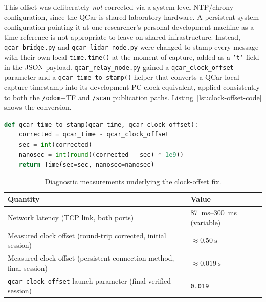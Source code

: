 This offset was deliberately \emph{not} corrected via a system-level
NTP/chrony configuration, since the QCar is shared laboratory
hardware. A persistent system configuration pointing it at one
researcher's personal development machine as a time reference is
not appropriate to leave on shared infrastructure. Instead,
\texttt{qcar\_bridge.py} and \texttt{qcar\_lidar\_node.py} were
changed to stamp every message with their own local
\texttt{time.time()} at the moment of capture, added as a
\texttt{'t'} field in the JSON payload. \texttt{qcar\_relay\_node.py}
gained a \texttt{qcar\_clock\_offset} parameter and a
\texttt{qcar\_time\_to\_stamp()} helper that converts a QCar-local
capture timestamp into its development-PC-clock equivalent, applied
consistently to both the \texttt{/odom}+TF and \texttt{/scan}
publication paths. Listing~\ref{lst:clock-offset-code} shows the
conversion.

\begin{lstlisting}[language=Python,caption={Converting a QCar-local capture timestamp to the development PC's clock (\texttt{qcar\_relay\_node.py}).},label={lst:clock-offset-code}]
def qcar_time_to_stamp(qcar_time, qcar_clock_offset):
    corrected = qcar_time - qcar_clock_offset
    sec = int(corrected)
    nanosec = int(round((corrected - sec) * 1e9))
    return Time(sec=sec, nanosec=nanosec)
\end{lstlisting}

\begin{table}[htbp]
  \centering
  \caption{Diagnostic measurements underlying the clock-offset fix.}
  \label{tab:clock-offset}
  \begin{tabular}{@{}ll@{}}
    \toprule
    Quantity & Value \\
    \midrule
    Network latency (TCP link, both ports) & \SIrange{87}{300}{\milli\second} (variable) \\
    Measured clock offset (round-trip corrected, initial session) & $\approx \SI{0.50}{\second}$ \\
    Measured clock offset (persistent-connection method, final session) & $\approx \SI{0.019}{\second}$ \\
    \texttt{qcar\_clock\_offset} launch parameter (final verified session) & \texttt{0.019} \\
    \bottomrule
  \end{tabular}
\end{table}

